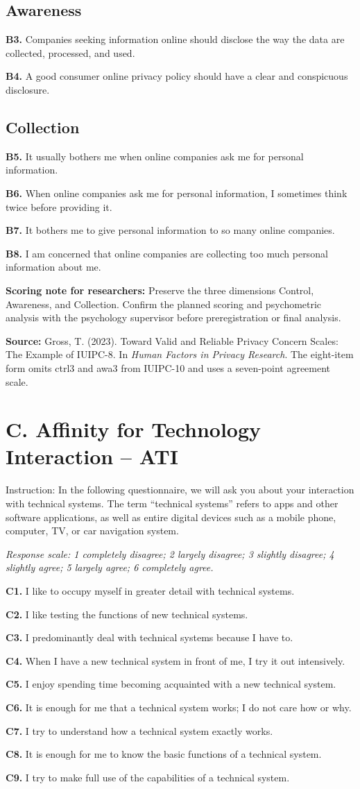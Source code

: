 \documentclass[10pt,a4paper]{article}
\newcommand{\scale}[1]{\textit{Response scale: #1}}
\newcommand{\qitem}[2]{\textbf{#1} #2\par}
\begin{document}
\subsection*{Awareness}
\qitem{B3.}{Companies seeking information online should disclose the way the data are collected, processed, and used.}
\qitem{B4.}{A good consumer online privacy policy should have a clear and conspicuous disclosure.}

\subsection*{Collection}
\qitem{B5.}{It usually bothers me when online companies ask me for personal information.}
\qitem{B6.}{When online companies ask me for personal information, I sometimes think twice before providing it.}
\qitem{B7.}{It bothers me to give personal information to so many online companies.}
\qitem{B8.}{I am concerned that online companies are collecting too much personal information about me.}

\textbf{Scoring note for researchers:} Preserve the three dimensions Control, Awareness, and Collection. Confirm the planned scoring and psychometric analysis with the psychology supervisor before preregistration or final analysis.

\textbf{Source:} Gross, T. (2023). Toward Valid and Reliable Privacy Concern Scales: The Example of IUIPC-8. In \textit{Human Factors in Privacy Research}. The eight-item form omits ctrl3 and awa3 from IUIPC-10 and uses a seven-point agreement scale.

\newpage
\section*{C. Affinity for Technology Interaction -- ATI}

Instruction: In the following questionnaire, we will ask you about your interaction with technical systems. The term ``technical systems'' refers to apps and other software applications, as well as entire digital devices such as a mobile phone, computer, TV, or car navigation system.

\scale{1 completely disagree; 2 largely disagree; 3 slightly disagree; 4 slightly agree; 5 largely agree; 6 completely agree.}

\qitem{C1.}{I like to occupy myself in greater detail with technical systems.}
\qitem{C2.}{I like testing the functions of new technical systems.}
\qitem{C3.}{I predominantly deal with technical systems because I have to.}
\qitem{C4.}{When I have a new technical system in front of me, I try it out intensively.}
\qitem{C5.}{I enjoy spending time becoming acquainted with a new technical system.}
\qitem{C6.}{It is enough for me that a technical system works; I do not care how or why.}
\qitem{C7.}{I try to understand how a technical system exactly works.}
\qitem{C8.}{It is enough for me to know the basic functions of a technical system.}
\qitem{C9.}{I try to make full use of the capabilities of a technical system.}
\end{document}
